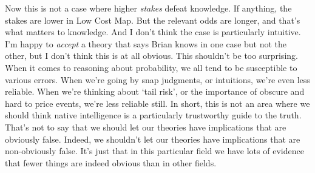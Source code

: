 Now this is not a case where higher \textit{stakes} defeat knowledge. If anything, the stakes are lower in Low Cost Map. But the relevant odds are longer, and that's what matters to knowledge. And I don't think the case is particularly intuitive. I'm happy to \textit{accept} a theory that says Brian knows in one case but not the other, but I don't think this is at all obvious. This shouldn't be too surprising. When it comes to reasoning about probability, we all tend to be susceptible to various errors. When we're going by snap judgments, or intuitions, we're even less reliable. When we're thinking about `tail risk', or the importance of obscure and hard to price events, we're less reliable still. In short, this is not an area where we should think native intelligence is a particularly trustworthy guide to the truth. That's not to say that we should let our theories have implications that are obviously false. Indeed, we shouldn't let our theories have implications that are non-obviously false. It's just that in this particular field we have lots of evidence that fewer things are indeed obvious than in other fields.

